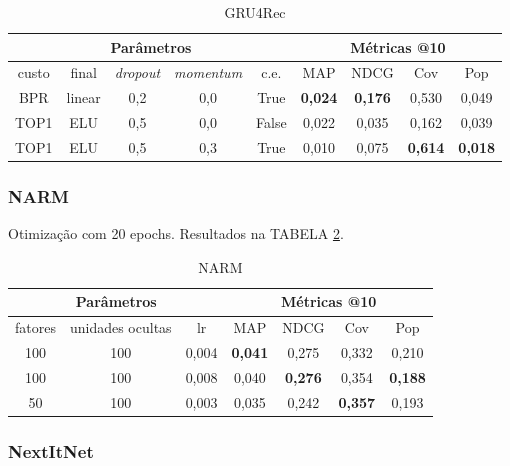 \begin{table}[htbp]
  \centering
  \begin{tabular}{|c|c|c|c|c|c|c|c|c|}
    \hline
      \multicolumn{5}{|c|}{Parâmetros} & \multicolumn{4}{c|}{Métricas @10} \\
      \hline
      custo & final & \textit{dropout} & \textit{momentum} & c.e. & MAP & NDCG & Cov & Pop \\
      \hline
      BPR & linear & 0,2 & 0,0 & True & \textbf{0,024} & \textbf{0,176} & 0,530 & 0,049 \\
      \hline
      TOP1 & ELU & 0,5 & 0,0 & False & 0,022 & 0,035 & 0,162 & 0,039 \\
      \hline
      TOP1 & ELU & 0,5 & 0,3 & True & 0,010 & 0,075 & \textbf{0,614} & \textbf{0,018} \\
      \hline
\end{tabular}
      \caption{GRU4Rec}
      \label{opt:GRU4Rec_rem}
\end{table}

\subsubsection{NARM}
Otimização com 20 epochs. Resultados na TABELA \ref{opt:NARM_rem}.

\begin{table}[htbp]
  \centering
  \begin{tabular}{|c|c|c|c|c|c|c|}
    \hline
      \multicolumn{3}{|c|}{Parâmetros} & \multicolumn{4}{c|}{Métricas @10} \\
      \hline
      fatores & unidades ocultas & lr & MAP & NDCG & Cov & Pop \\
      \hline
      100 & 100 & 0,004 & \textbf{0,041} & 0,275 & 0,332 & 0,210 \\
      \hline
      100 & 100 & 0,008 & 0,040 & \textbf{0,276} & 0,354 & \textbf{0,188} \\
      \hline
      50 & 100 & 0,003 & 0,035 & 0,242 & \textbf{0,357} & 0,193 \\
      \hline
\end{tabular}
      \caption{NARM}
      \label{opt:NARM_rem}
\end{table}

\subsubsection{NextItNet}

